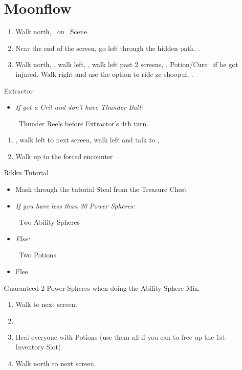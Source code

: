 \chapter{Moonflow}

\begin{enumerate}
	\item Walk north, \sd\ on \kimahri\ Scene.
	\item Near the end of the screen, go left through the hidden path. .
	\item Walk north, \sd, walk left, \sd, walk left past 2 screens, \sd.  Potion/Cure \tidus\ if he got injured. Walk right and use the  option to ride ze shoopuf, \sd.
\end{enumerate}
\bothvfill\winvfill\lossvfill
\begin{battle}[4000]{Extractor}
	\begin{itemize}
		\tidusf Haste self, then \wakka
		\wakkaf Attack
		\tidusf \textit{If Lightning Steel:}
		\begin{itemize}
			\item Cheer x1
		\end{itemize}
		\textit{Else:}
		\begin{itemize}
			\item Cheer x4
		\end{itemize}
		\tidusf Attack
		\item \textit{If got a Crit and don't have Thunder Ball:}
		\begin{itemize}
			\wakkaf \od\ Thunder Reels before Extractor's 4th turn.
		\end{itemize}
	\end{itemize}
\end{battle}
\begin{enumerate}[resume]
	\item \sd, walk left to next screen, walk left and talk to \rikku, \sd
	\item Walk up to the forced encounter
\end{enumerate}
\begin{battle}{Rikku Tutorial}
	\begin{itemize}
		\item Mash through the tutorial
		\rikkuf Steal from the Treasure Chest
		\item \textit{If you have less than 30 Power Spheres:}
		      \begin{itemize}
			      \rikkuf \od\ Two Ability Spheres
		      \end{itemize}
		\item \textit{Else:}
		      \begin{itemize}
			      \rikkuf \od\ Two Potions
		      \end{itemize}
		\item Flee
	\end{itemize}
Guaranteed 2 Power Spheres when doing the Ability Sphere Mix.
\end{battle}
\begin{enumerate}[resume]
	\item Walk to next screen.
	\item \formation{\tidus}{\wakka}{\auron}
	\item Heal everyone with Potions (use them all if you can to free up the 1st Inventory Slot)
	\item Walk north to next screen.
\end{enumerate}